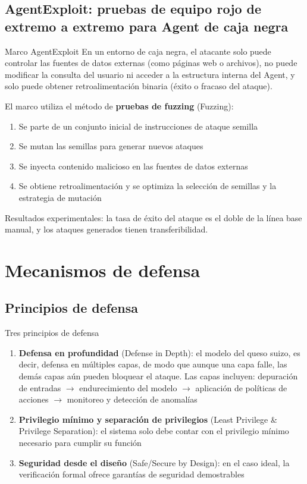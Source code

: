 \documentclass[a4paper]{article}
\begin{document}
\subsection{AgentExploit: pruebas de equipo rojo de extremo a extremo para Agent de caja negra}

\begin{importantbox}{Marco AgentExploit}
En un entorno de caja negra, el atacante solo puede controlar las fuentes de datos externas (como páginas web o archivos), no puede modificar la consulta del usuario ni acceder a la estructura interna del Agent, y solo puede obtener retroalimentación binaria (éxito o fracaso del ataque).

El marco utiliza el método de \textbf{pruebas de fuzzing} (Fuzzing):
\begin{enumerate}
    \item Se parte de un conjunto inicial de instrucciones de ataque semilla
    \item Se mutan las semillas para generar nuevos ataques
    \item Se inyecta contenido malicioso en las fuentes de datos externas
    \item Se obtiene retroalimentación y se optimiza la selección de semillas y la estrategia de mutación
\end{enumerate}
Resultados experimentales: la tasa de éxito del ataque es el doble de la línea base manual, y los ataques generados tienen transferibilidad.
\end{importantbox}
\section{Mecanismos de defensa}

\subsection{Principios de defensa}

\begin{importantbox}{Tres principios de defensa}
\begin{enumerate}
    \item \textbf{Defensa en profundidad} (Defense in Depth): el modelo del queso suizo, es decir, defensa en múltiples capas, de modo que aunque una capa falle, las demás capas aún pueden bloquear el ataque. Las capas incluyen: depuración de entradas $\to$ endurecimiento del modelo $\to$ aplicación de políticas de acciones $\to$ monitoreo y detección de anomalías
    \item \textbf{Privilegio mínimo y separación de privilegios} (Least Privilege \& Privilege Separation): el sistema solo debe contar con el privilegio mínimo necesario para cumplir su función
    \item \textbf{Seguridad desde el diseño} (Safe/Secure by Design): en el caso ideal, la verificación formal ofrece garantías de seguridad demostrables
\end{enumerate}
\end{importantbox}
\end{document}
